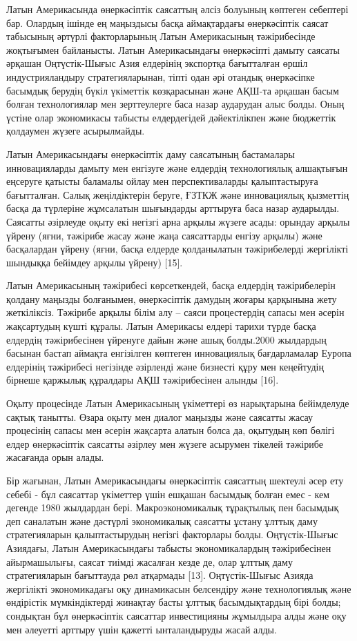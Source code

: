 \begin{multicols}{2}
Латын Америкасында өнеркәсіптік саясаттың әлсіз болуының көптеген
себептері бар. Олардың ішінде ең маңыздысы басқа аймақтардағы
өнеркәсіптік саясат табысының әртүрлі факторларының Латын Америкасының
тәжірибесінде жоқтығымен байланысты. Латын Америкасындағы өнеркәсіпті
дамыту саясаты әрқашан Оңтүстік-Шығыс Азия елдерінің экспортқа
бағытталған өршіл индустрияландыру стратегияларынан, тіпті одан әрі
отандық өнеркәсіпке басымдық берудің бүкіл үкіметтік көзқарасынан және
АҚШ-та әрқашан басым болған технологиялар мен зерттеулерге баса назар
аударудан алыс болды. Оның үстіне олар экономикасы табысты елдердегідей
дәйектілікпен және бюджеттік қолдаумен жүзеге асырылмайды.

Латын Америкасындағы өнеркәсіптік даму саясатының бастамалары
инновацияларды дамыту мен енгізуге және елдердің технологиялық
алшақтығын еңсеруге қатысты баламалы ойлау мен перспективаларды
қалыптастыруға бағытталған. Салық жеңілдіктерін беруге, ҒЗТКЖ және
инновациялық қызметтің басқа да түрлеріне жұмсалатын шығындарды
арттыруға баса назар аударылды. Саясатты әзірлеуде оқыту екі негізгі
арна арқылы жүзеге асады: орындау арқылы үйрену (яғни, тәжірибе жасау
және жаңа саясаттарды енгізу арқылы) және басқалардан үйрену (яғни,
басқа елдерде қолданылатын тәжірибелерді жергілікті шындыққа бейімдеу
арқылы үйрену) {[}15{]}.

Латын Америкасының тәжірибесі көрсеткендей, басқа елдердің тәжірибелерін
қолдану маңызды болғанымен, өнеркәсіптік дамудың жоғары қарқынына жету
жеткіліксіз. Тәжірибе арқылы білім алу -- саяси процестердің сапасы мен
әсерін жақсартудың күшті құралы. Латын Америкасы елдері тарихи түрде
басқа елдердің тәжірибесінен үйренуге дайын және ашық болды.2000
жылдардың басынан бастап аймақта енгізілген көптеген инновациялық
бағдарламалар Еуропа елдерінің тәжірибесі негізінде әзірленді және
бизнесті құру мен кеңейтудің бірнеше қаржылық құралдары АҚШ
тәжірибесінен алынды {[}16{]}.

Оқыту процесінде Латын Америкасының үкіметтері өз нарықтарына
бейімделуде сақтық танытты. Өзара оқыту мен диалог маңызды және саясатты
жасау процесінің сапасы мен әсерін жақсарта алатын болса да, оқытудың
көп бөлігі елдер өнеркәсіптік саясатты әзірлеу мен жүзеге асырумен
тікелей тәжірибе жасағанда орын алады.

Бір жағынан, Латын Америкасындағы өнеркәсіптік саясаттың шектеулі әсер
ету себебі - бұл саясаттар үкіметтер үшін ешқашан басымдық болған емес -
кем дегенде 1980 жылдардан бері. Макроэкономикалық тұрақтылық пен
басымдық деп саналатын және дәстүрлі экономикалық саясатты ұстану ұлттық
даму стратегияларын қалыптастырудың негізгі факторлары болды.
Оңтүстік-Шығыс Азиядағы, Латын Америкасындағы табысты экономикалардың
тәжірибесінен айырмашылығы, саясат тиімді жасалған кезде де, олар ұлттық
даму стратегияларын бағыттауда рөл атқармады {[}13{]}. Оңтүстік-Шығыс
Азияда жергілікті экономикадағы оқу динамикасын белсендіру және
технологиялық және өндірістік мүмкіндіктерді жинақтау басты ұлттық
басымдықтардың бірі болды; сондықтан бұл өнеркәсіптік саясаттар
инвестицияны жұмылдыра алды және оқу мен әлеуетті арттыру үшін қажетті
ынталандыруды жасай алды.


\end{multicols}
